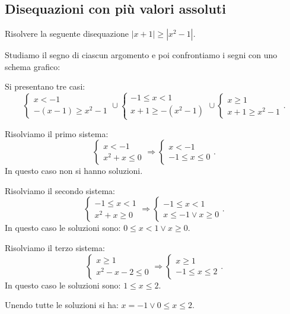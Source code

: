 \subsection{Disequazioni con più valori assoluti}
\begin{exrig}
\begin{esempio}
Risolvere la seguente disequazione $\left|x+1\right|\ge \left|x^2-1\right|$.

Studiamo il segno di ciascun argomento e poi confrontiamo i segni con uno schema grafico:
\begin{center}

\end{center}
Si presentano tre casi: 
\[\left\{\begin{array}{l}{x<-1}\\{-(x-1)\ge x^2-1}\end{array}\right.\cup \left\{\begin{array}{l}{-1\le x<1}\\{x+1\ge -\left(x^2-1\right)}\end{array}\right.\cup \left\{\begin{array}{l}{x\ge 1}\\{x+1\ge x^2-1}\end{array}\right..\]

Risolviamo il primo sistema: \[\left\{\begin{array}{l}x<-1\\x^2+x\le 0\end{array}\right.\Rightarrow \left\{\begin{array}{l}x<-1 \\-1\le x\le 0\end{array}\right..\] 
In questo caso non si hanno soluzioni.

Risolviamo il secondo sistema: 
\[\left\{\begin{array}{l}-1\le x<1\\x^2+x\ge 0\end{array}\right.\Rightarrow \left\{\begin{array}{l}-1\le x<1 \\x\le -1\vee x\ge 0\end{array}\right..\] 
In questo caso le soluzioni sono: $0\le x<1\vee x\ge 0.$

Risolviamo il terzo sistema: \[\left\{\begin{array}{l}x\ge 1\\x^2-x-2\le 0\end{array}\right.\Rightarrow \left\{\begin{array}{l}x\ge 1 \\-1\le x\le 2\end{array}\right..\] 
In questo caso le soluzioni sono: $1\le x\le 2.$
\begin{center}

\end{center}

Unendo tutte le soluzioni si ha: $x=-1\vee 0\le x\le 2$.
\end{esempio}
\end{exrig}

\newpage

